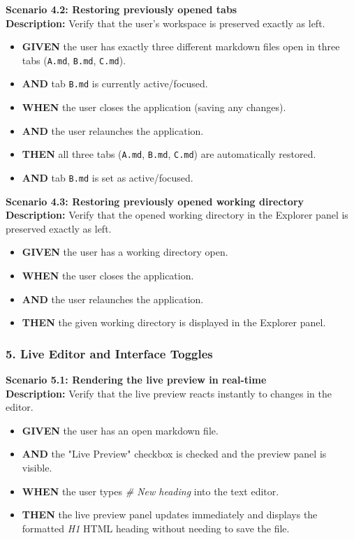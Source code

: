 \documentclass[12pt, a4paper]{article}
\begin{document}
\textbf{Scenario 4.2: Restoring previously opened tabs} \\
\textbf{Description:} Verify that the user's workspace is preserved exactly as left.
\begin{itemize}
    \item \textbf{GIVEN} the user has exactly three different markdown files open in three tabs (\texttt{A.md}, \texttt{B.md}, \texttt{C.md}).
    \item \textbf{AND} tab \texttt{B.md} is currently active/focused.
    \item \textbf{WHEN} the user closes the application (saving any changes).
    \item \textbf{AND} the user relaunches the application.
    \item \textbf{THEN} all three tabs (\texttt{A.md}, \texttt{B.md}, \texttt{C.md}) are automatically restored.
    \item \textbf{AND} tab \texttt{B.md} is set as active/focused.
\end{itemize}

\textbf{Scenario 4.3: Restoring previously opened working directory} \\
\textbf{Description:} Verify that the opened working directory in the Explorer panel is preserved exactly as left.
\begin{itemize}
    \item \textbf{GIVEN} the user has a working directory open.
    \item \textbf{WHEN} the user closes the application.
    \item \textbf{AND} the user relaunches the application.
    \item \textbf{THEN} the given working directory is displayed in the Explorer panel.
\end{itemize}

\subsubsection*{5. Live Editor and Interface Toggles}

\textbf{Scenario 5.1: Rendering the live preview in real-time} \\
\textbf{Description:} Verify that the live preview reacts instantly to changes in the editor.
\begin{itemize}
    \item \textbf{GIVEN} the user has an open markdown file.
    \item \textbf{AND} the "Live Preview" checkbox is checked and the preview panel is visible.
    \item \textbf{WHEN} the user types \textit{\# New heading} into the text editor.
    \item \textbf{THEN} the live preview panel updates immediately and displays the formatted \textit{H1} HTML heading without needing to save the file.
\end{itemize}
\end{document}
